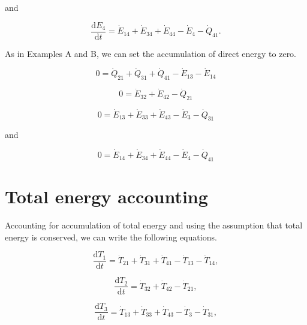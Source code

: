 \noindent and 

\begin{equation} \label{eq:D-CV_E_dot_4}
	\frac{\mathrm{d}E_{4}}{\mathrm{d}t} 	 = \dot{E}_{14} + \dot{E}_{34} + \dot{E}_{44} - \dot{E}_{4} - \dot{Q}_{41}.
\end{equation}

As in Examples A and B, we can set the accumulation of direct energy to zero.

\begin{equation} \label{eq:D-CV_E_dot_1_SS}
	0 =  \dot{Q}_{21} + \dot{Q}_{31} + \dot{Q}_{41} - \dot{E}_{13} - \dot{E}_{14}
\end{equation}

\begin{equation} \label{eq:D-CV_E_dot_2_SS}
	0  = \dot{E}_{32}  + \dot{E}_{42} - \dot{Q}_{21}
\end{equation}

\begin{equation} \label{eq:D-CV_E_dot_3_SS}
	0 = \dot{E}_{13} + \dot{E}_{33} + \dot{E}_{43} - \dot{E}_{3} - \dot{Q}_{31}
\end{equation}

\noindent and 

\begin{equation} \label{eq:D-CV_E_dot_4_SS}
	0 = \dot{E}_{14} + \dot{E}_{34} + \dot{E}_{44} - \dot{E}_4 - \dot{Q}_{41}
\end{equation}


\section{Total energy accounting}

Accounting for accumulation of total energy and using the assumption that total energy is conserved, we can write the following equations.

\begin{equation} \label{eq:D-CV_T_1}
	\frac{\mathrm{d}T_{1}}{\mathrm{d}t} 	 = \dot{T}_{21} + \dot{T}_{31} + \dot{T}_{41} - \dot{T}_{13} - \dot{T}_{14},
\end{equation}

\begin{equation} \label{eq:D-CV_T_2}
	\frac{\mathrm{d}T_{2}}{\mathrm{d}t} 	 = \dot{T}_{32} + \dot{T}_{42} - \dot{T}_{21},
\end{equation}

\begin{equation} \label{eq:D-CV_T_3}
	\frac{\mathrm{d}T_{3}}{\mathrm{d}t} 	 = \dot{T}_{13} + \dot{T}_{33} + \dot{T}_{43} - \dot{T}_{3} - \dot{T}_{31},
\end{equation}

